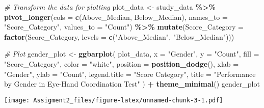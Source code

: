 \documentclass[
]{article}
\newenvironment{Shaded}{\begin{snugshade}}{\end{snugshade}}
\newcommand{\AttributeTok}[1]{\textcolor[rgb]{0.13,0.29,0.53}{#1}}
\newcommand{\CommentTok}[1]{\textcolor[rgb]{0.56,0.35,0.01}{\textit{#1}}}
\newcommand{\FunctionTok}[1]{\textcolor[rgb]{0.13,0.29,0.53}{\textbf{#1}}}
\newcommand{\NormalTok}[1]{#1}
\newcommand{\OtherTok}[1]{\textcolor[rgb]{0.56,0.35,0.01}{#1}}
\newcommand{\SpecialCharTok}[1]{\textcolor[rgb]{0.81,0.36,0.00}{\textbf{#1}}}
\newcommand{\StringTok}[1]{\textcolor[rgb]{0.31,0.60,0.02}{#1}}
\begin{document}
\begin{Shaded}
\begin{Highlighting}[]
\CommentTok{\# Transform the data for plotting}
\NormalTok{plot\_data }\OtherTok{\textless{}{-}}\NormalTok{ study\_data }\SpecialCharTok{\%\textgreater{}\%}
  \FunctionTok{pivot\_longer}\NormalTok{(}\AttributeTok{cols =} \FunctionTok{c}\NormalTok{(Above\_Median, Below\_Median),}
               \AttributeTok{names\_to =} \StringTok{"Score\_Category"}\NormalTok{,}
               \AttributeTok{values\_to =} \StringTok{"Count"}\NormalTok{) }\SpecialCharTok{\%\textgreater{}\%}
  \FunctionTok{mutate}\NormalTok{(}\AttributeTok{Score\_Category =} \FunctionTok{factor}\NormalTok{(Score\_Category, }\AttributeTok{levels =} \FunctionTok{c}\NormalTok{(}\StringTok{"Above\_Median"}\NormalTok{, }\StringTok{"Below\_Median"}\NormalTok{)))}

\CommentTok{\# Plot}
\NormalTok{gender\_plot }\OtherTok{\textless{}{-}} \FunctionTok{ggbarplot}\NormalTok{(}
\NormalTok{  plot\_data, }\AttributeTok{x =} \StringTok{"Gender"}\NormalTok{, }\AttributeTok{y =} \StringTok{"Count"}\NormalTok{, }\AttributeTok{fill =} \StringTok{"Score\_Category"}\NormalTok{,}
  \AttributeTok{color =} \StringTok{"white"}\NormalTok{, }\AttributeTok{position =} \FunctionTok{position\_dodge}\NormalTok{(),}
  \AttributeTok{xlab =} \StringTok{"Gender"}\NormalTok{, }\AttributeTok{ylab =} \StringTok{"Count"}\NormalTok{,}
  \AttributeTok{legend.title =} \StringTok{"Score Category"}\NormalTok{,}
  \AttributeTok{title =} \StringTok{"Performance by Gender in Eye{-}Hand Coordination Test"}
\NormalTok{) }\SpecialCharTok{+}
  \FunctionTok{theme\_minimal}\NormalTok{()}
\NormalTok{gender\_plot}
\end{Highlighting}
\end{Shaded}

\texttt{[image: Assigment2\_files/figure-latex/unnamed-chunk-3-1.pdf]}
\end{document}
